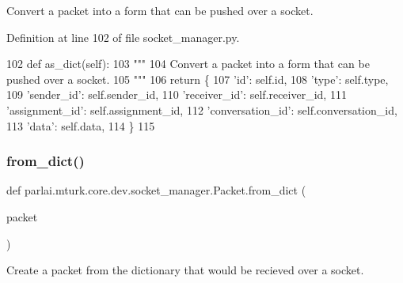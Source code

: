 \begin{DoxyVerb}Convert a packet into a form that can be pushed over a socket.
\end{DoxyVerb}
 

Definition at line 102 of file socket\+\_\+manager.\+py.


\begin{DoxyCode}
102     \textcolor{keyword}{def }as\_dict(self):
103         \textcolor{stringliteral}{"""}
104 \textcolor{stringliteral}{        Convert a packet into a form that can be pushed over a socket.}
105 \textcolor{stringliteral}{        """}
106         \textcolor{keywordflow}{return} \{
107             \textcolor{stringliteral}{'id'}: self.id,
108             \textcolor{stringliteral}{'type'}: self.type,
109             \textcolor{stringliteral}{'sender\_id'}: self.sender\_id,
110             \textcolor{stringliteral}{'receiver\_id'}: self.receiver\_id,
111             \textcolor{stringliteral}{'assignment\_id'}: self.assignment\_id,
112             \textcolor{stringliteral}{'conversation\_id'}: self.conversation\_id,
113             \textcolor{stringliteral}{'data'}: self.data,
114         \}
115 
\end{DoxyCode}
\mbox{\label{classparlai_1_1mturk_1_1core_1_1dev_1_1socket__manager_1_1Packet_a02cdee81b0dbf9f893da7f288eadf1ea}} 
\subsubsection{\texorpdfstring{from\+\_\+dict()}{from\_dict()}}
{\footnotesize\ttfamily def parlai.\+mturk.\+core.\+dev.\+socket\+\_\+manager.\+Packet.\+from\+\_\+dict (\begin{DoxyParamCaption}\item[{}]{packet }\end{DoxyParamCaption})\hspace{0.3cm}{\ttfamily [static]}}

\begin{DoxyVerb}Create a packet from the dictionary that would be recieved over a socket.
\end{DoxyVerb}
 

